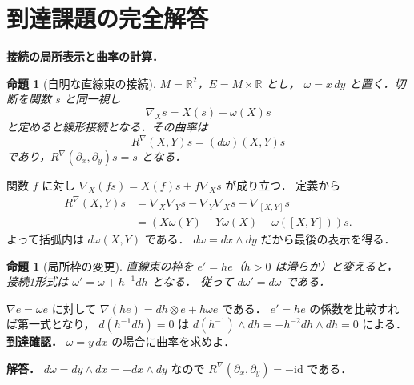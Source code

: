 \documentclass[a5paper,10pt,onecolumn]{jsarticle}
\makeatletter
\theoremstyle{mathnotetheorem}
\newtheorem{proposition}[theorem]{命題}
\renewcommand{\proofname}{証明}
\renewenvironment{proof}[1][\proofname]{%
  \par\pushQED{\qed}\normalfont\topsep4\p@\@plus2\p@\relax
  \trivlist\item[\hskip\labelsep\bfseries #1]\ignorespaces
}{\popQED\endtrivlist\@endpefalse}
\makeatother
\begin{document}
\section{到達課題の完全解答}
\noindent\textbf{接続の局所表示と曲率の計算．}
\begin{proposition}[自明な直線束の接続]
$M=\mathbb R^2$，$E=M\times\mathbb R$ とし，
$\omega=x\,dy$ と置く．切断を関数 $s$ と同一視し
\[
\nabla_Xs=X(s)+\omega(X)s
\]
と定めると線形接続となる．その曲率は
\[
R^\nabla(X,Y)s=(d\omega)(X,Y)s
\]
であり，$R^\nabla(\partial_x,\partial_y)s=s$ となる．
\end{proposition}
\begin{proof}
関数 $f$ に対し
$\nabla_X(fs)=X(f)s+f\nabla_Xs$ が成り立つ．
定義から
\[
\begin{aligned}
R^\nabla(X,Y)s
&=\nabla_X\nabla_Ys-\nabla_Y\nabla_Xs
-\nabla_{[X,Y]}s\\
&=(X\omega(Y)-Y\omega(X)-\omega([X,Y]))s.
\end{aligned}
\]
よって括弧内は $d\omega(X,Y)$ である．
$d\omega=dx\wedge dy$ だから最後の表示を得る．
\end{proof}
\begin{proposition}[局所枠の変更]
直線束の枠を $e'=he$（$h>0$ は滑らか）と変えると，
接続1形式は
$\omega'=\omega+h^{-1}dh$ となる．
従って $d\omega'=d\omega$ である．
\end{proposition}
\begin{proof}
$\nabla e=\omega e$ に対して
$\nabla(he)=dh\otimes e+h\omega e$ である．
$e'=he$ の係数を比較すれば第一式となり，
$d(h^{-1}dh)=0$ は
$d(h^{-1})\wedge dh= -h^{-2}dh\wedge dh=0$
による．
\end{proof}
\noindent\textbf{到達確認．}
$\omega=y\,dx$ の場合に曲率を求めよ．
\par\noindent\textbf{解答．}
$d\omega=dy\wedge dx=-dx\wedge dy$ なので
$R^\nabla(\partial_x,\partial_y)=-\mathrm{id}$ である．
\end{document}
